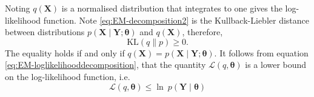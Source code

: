 \documentclass[review,authoryear,3p]{elsarticle}
\begin{document}
Noting  $q(\mathbf X)$ is a normalised distribution that integrates to one gives the log-likelihood function. Note \eqref{eq:EM-decomposition2} is the Kullback-Liebler distance between distributions $p(\mathbf X \mid \mathbf Y;\boldsymbol\theta)$ and $q(\mathbf X)$, therefore,
\begin{equation}
	\mathrm{KL}(q\parallel p)\ge 0.
\end{equation}   
The equality holds if and only if $q(\mathbf X)=p(\mathbf X \mid \mathbf Y;\boldsymbol\theta)$. It follows from equation \eqref{eq:EM-loglikelihooddecomposition}, that the quantity $\mathcal{L}(q,\boldsymbol\theta)$ is a lower bound on the log-likelihood function, i.e.
\begin{equation}
 \mathcal{L}(q,\boldsymbol\theta)\le \ln~p(\mathbf Y\mid\boldsymbol\theta)
	\end{equation} 
\end{document}
